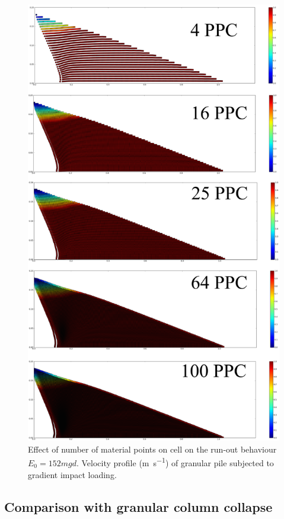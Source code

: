 \begin{figure}[tbhp]
\centering
\includegraphics[height=\textheight]{MPM_500ppc}
\caption{Effect of number of material points on cell on the run-out behaviour 
$E_0=152mgd$. 
Velocity profile (\si{\m\per\s}) of granular pile subjected to gradient impact 
loading.}
\label{fig:MPM_500ppc}
\end{figure}

\subsection{Comparison with granular column collapse}


